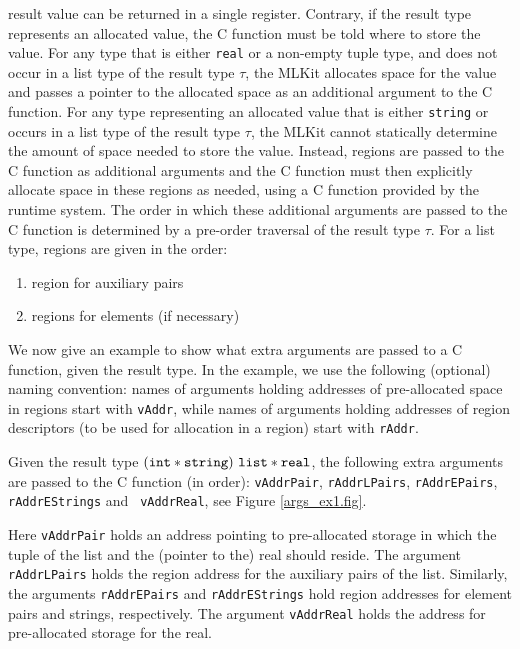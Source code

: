 \documentclass[12pt]{book}
\begin{document}
result value can be returned in a single register. Contrary, if the result type represents an allocated
value, the C function must be told where to store the value. For
any type that is either {\tt real} or a non-empty tuple type, and
does not occur in a list type of the result type $\tau$, the MLKit
allocates space for the value and passes a pointer to the allocated
space as an additional argument to the C function. For any type
representing an allocated value that is either {\tt string} or occurs in a
list type of the result type $\tau$, the MLKit cannot statically
determine the amount of space needed to store the value. Instead,
regions are passed to the C function as additional arguments and the C
function must then explicitly allocate space in these regions as
needed, using a C function provided by the runtime system. The order
in which these additional arguments are passed to the C function is determined
by a pre-order traversal of the result type $\tau$.  For a list type,
regions are given in the order:
\begin{enumerate}
    \item region for auxiliary pairs
    \item regions for elements (if necessary)
\end{enumerate}

We now give an example to show what extra arguments are passed to a
C function, given the result type. In the example, we use the following
(optional) naming convention: 
names of arguments holding addresses of 
pre-allocated space in regions 
start with {\tt vAddr}, while names of arguments
holding addresses of region descriptors (to be used for allocation in a
region) start with {\tt rAddr}.
\begin{example}
  Given the result type $({\tt int} \ast {\tt string}) ~{\tt list}
  \ast {\tt real}$, the following extra ar\-gu\-ments are passed to the
  C function (in order): {\tt vAddrPair},
  {\tt rAddrLPairs}, {\tt rAddrEPairs}, {\tt rAddrEStrings} and {\tt
    vAddrReal}, see Figure \ref{args_ex1.fig}. 
  
  Here {\tt vAddrPair} holds an address pointing to pre-allocated
  storage in which the tuple of the list and the (pointer to the) real
  should reside. The argument {\tt rAddrLPairs} holds the region
  address for the auxiliary pairs of the list. Similarly, the
  arguments {\tt rAddrEPairs} and {\tt rAddrEStrings} hold region
  addresses for element pairs and strings, respectively. The argument
  {\tt vAddrReal} holds the address for pre-allocated storage for the
  real.
\end{example}
\end{document}
